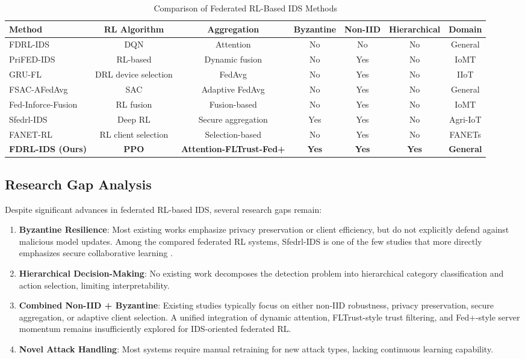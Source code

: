 \documentclass[conference]{IEEEtran}
\begin{document}
\begin{table}[htbp]
\caption{Comparison of Federated RL-Based IDS Methods}
\label{tab:fed_comparison}
\centering
\begin{tabular}{lcccccc}
\toprule
\textbf{Method} & \textbf{RL Algorithm} & \textbf{Aggregation} & \textbf{Byzantine} & \textbf{Non-IID} & \textbf{Hierarchical} & \textbf{Domain} \\
\midrule
FDRL-IDS \cite{original_paper} & DQN & Attention & No & No & No & General \\
PriFED-IDS \cite{prifed_ids} & RL-based & Dynamic fusion & No & Yes & No & IoMT \\
GRU-FL \cite{gru_fl} & DRL device selection & FedAvg & No & Yes & No & IIoT \\
FSAC-AFedAvg & SAC & Adaptive FedAvg & No & Yes & No & General \\
Fed-Inforce-Fusion & RL fusion & Fusion-based & No & Yes & No & IoMT \\
Sfedrl-IDS & Deep RL & Secure aggregation & Yes & Yes & No & Agri-IoT \\
FANET-RL & RL client selection & Selection-based & No & Yes & No & FANETs \\
\midrule
\textbf{FDRL-IDS (Ours)} & \textbf{PPO} & \textbf{Attention-FLTrust-Fed+} & \textbf{Yes} & \textbf{Yes} & \textbf{Yes} & \textbf{General} \\
\bottomrule
\end{tabular}
\end{table}

\subsection{Research Gap Analysis}

Despite significant advances in federated RL-based IDS, several research gaps remain:

\begin{enumerate}
    \item \textbf{Byzantine Resilience}: Most existing works emphasize privacy preservation or client efficiency, but do not explicitly defend against malicious model updates. Among the compared federated RL systems, Sfedrl-IDS is one of the few studies that more directly emphasizes secure collaborative learning \cite{sfedrl_ids}.

    \item \textbf{Hierarchical Decision-Making}: No existing work decomposes the detection problem into hierarchical category classification and action selection, limiting interpretability.

    \item \textbf{Combined Non-IID + Byzantine}: Existing studies typically focus on either non-IID robustness, privacy preservation, secure aggregation, or adaptive client selection. A unified integration of dynamic attention, FLTrust-style trust filtering, and Fed+-style server momentum remains insufficiently explored for IDS-oriented federated RL.

    \item \textbf{Novel Attack Handling}: Most systems require manual retraining for new attack types, lacking continuous learning capability.
\end{enumerate}
\end{document}
